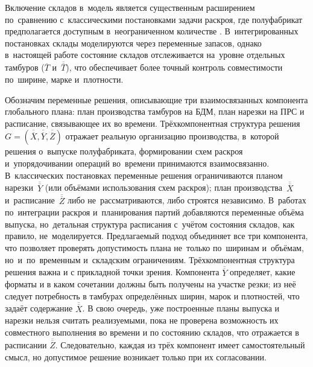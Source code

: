 Включение складов в~модель является существенным расширением по~сравнению с~классическими постановками задачи раскроя, где полуфабрикат предполагается доступным в~неограниченном количестве \cite{gilmore1961linear,delorme2016bin}.
В~интегрированных постановках \cite{nonas2000combined,melega2018review,leao2016decomposition, pochet2006_prodplan_mip} склады моделируются через переменные запасов, однако в~настоящей работе состояние складов отслеживается на~уровне отдельных тамбуров ($\overline{T}$ и~$\overline{\overline{T}}$), что обеспечивает более точный контроль совместимости по~ширине, марке и~плотности.

Обозначим переменные решения, описывающие три взаимосвязанных компонента глобального плана: план производства тамбуров на БДМ, план нарезки на ПРС и расписание, связывающее их во времени.
Трёхкомпонентная структура решения $G=(\overline{\overline{X}},\overline{\overline{Y}},\overline{\overline{Z}})$ отражает реальную организацию производства, в~которой решения о~выпуске полуфабриката, формировании схем раскроя и~упорядочивании операций во~времени принимаются взаимосвязанно.
В~классических постановках \cite{gilmore1961linear,haessler1991} переменные решения ограничиваются планом нарезки~$\overline{\overline{Y}}$ (или объёмами использования схем раскроя); план производства~$\overline{\overline{X}}$ и~расписание~$\overline{\overline{Z}}$ либо не~рассматриваются, либо строятся независимо.
В~работах по~интеграции раскроя и~планирования партий \cite{nonas2000combined,poltroniere2016tema} добавляются переменные объёма выпуска, но~детальная структура расписания с~учётом состояния складов, как правило, не~моделируется.
Предлагаемый подход объединяет все три компонента, что позволяет проверять допустимость плана не~только по~ширинам и~объёмам, но~и~по~временным и~складским ограничениям.
Трёхкомпонентная структура решения важна и с прикладной точки зрения. Компонента $\overline{\overline{Y}}$ определяет, какие форматы и в каком сочетании должны быть получены на участке резки; из неё следует потребность в тамбурах определённых ширин, марок и плотностей, что задаёт содержание $\overline{\overline{X}}$. В свою очередь, уже построенные планы выпуска и нарезки нельзя считать реализуемыми, пока не проверена возможность их совместного выполнения во времени и по состоянию складов, что отражается в расписании $\overline{\overline{Z}}$. Следовательно, каждая из трёх компонент имеет самостоятельный смысл, но допустимое решение возникает только при их согласовании.

